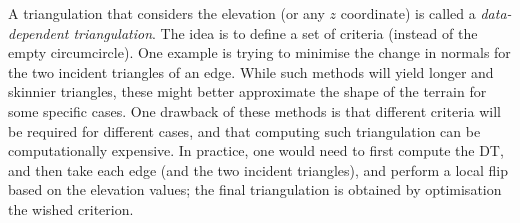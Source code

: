 A triangulation that considers the elevation (or any $z$ coordinate) is called a \emph{data-dependent triangulation}.
The idea is to define a set of criteria (instead of the empty circumcircle).
One example is trying to minimise the change in normals for the two incident triangles of an edge.
While such methods will yield longer and skinnier triangles, these might better approximate the shape of the terrain for some specific cases.
One drawback of these methods is that different criteria will be required for different cases, and that computing such triangulation can be computationally expensive.
In practice, one would need to first compute the DT, and then take each edge (and the two incident triangles), and perform a local flip based on the elevation values; the final triangulation is obtained by optimisation the wished criterion.



